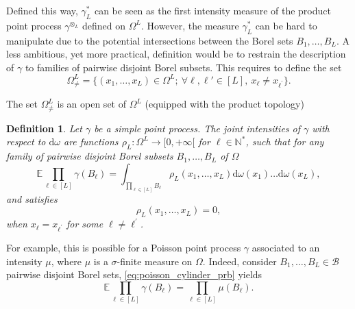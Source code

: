 \documentclass[twoside,11pt]{book}
\newtheorem{definition}{Definition}
\numberwithin{theorem}{chapter}
\numberwithin{definition}{chapter}
\numberwithin{proposition}{chapter}
\numberwithin{corollary}{chapter}
\numberwithin{example}{chapter}
\numberwithin{lemma}{chapter}
\begin{document}
Defined this way, $\gamma_{L}^{*}$ can be seen as the first intensity measure of the product point process $\gamma^{\otimes_{L}}$ defined on $\Omega^{L}$. However, the measure $\gamma_L^{*}$ can be hard to manipulate due to the potential intersections between the Borel sets $B_{1}, \dots, B_{L}$. A less ambitious, yet more practical, definition would be to restrain the description of $\gamma$ to families of pairwise disjoint Borel subsets. This requires to define the set 
\begin{equation}
\Omega_{\neq}^{L} = \{ (x_{1}, \dots, x_{L}) \in \Omega^{L}; \: \forall \ell,\ell' \in [L], \: x_{\ell} \neq x_{\ell^{'}} \}.
\end{equation}

The set $\Omega_{\neq}^{L}$ is an open set of $\Omega^{L}$ (equipped with the product topology)






\begin{definition}
Let $\gamma$ be a simple point process. The joint intensities of $\gamma$ with respect to $\mathrm{d}\omega$ are functions $\rho_{L}: \Omega^{L} \rightarrow [0,+\infty[$ for $\ell \in \mathbb{N}^{*}$, such that for any family of pairwise disjoint Borel subsets $B_{1}, \dots, B_{L}$ of $\Omega$
\begin{equation}\label{eq:pointprocess_intensity}
\mathbb{E} \prod\limits_{\ell \in [L]} \gamma(B_{\ell}) = \int_{\prod\limits_{\ell \in [L]}B_{\ell}} \rho_{L}(x_{1}, \dots, x_{L}) \mathrm{d}\omega(x_{1}) \dots \mathrm{d}\omega(x_{L}),
\end{equation}
and satisfies
\begin{equation}
\rho_{L}(x_{1}, \dots, x_{L}) = 0,
\end{equation}
when $x_{\ell} = x_{\ell^{'}}$ for some $\ell \neq \ell^{'}$.
\end{definition}


For example, this is possible for a Poisson point process $\gamma$ associated to an intensity $\mu$, where $\mu$ is a $\sigma$-finite measure on $\Omega$. Indeed, consider $B_{1}, \dots, B_{L} \in \mathcal{B}$ pairwise disjoint Borel sets, \eqref{eq:poisson_cylinder_prb} yields
\begin{equation}\label{eq:ppp_orthogonality}
 \mathbb{E} \prod\limits_{\ell \in [L]} \gamma(B_\ell) = \prod\limits_{\ell \in [L]}\mu(B_\ell).
\end{equation}
\end{document}
